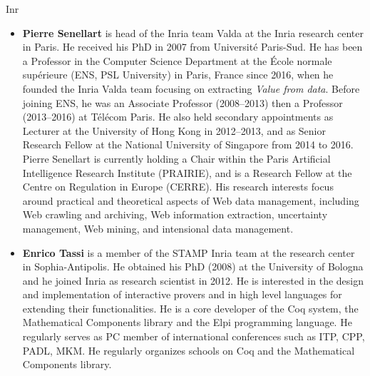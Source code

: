 \begin{sitedescription}{Inr}
\begin{itemize}
\item{\bf Pierre Senellart} is head of the Inria team Valda at the Inria
  research center in Paris. He
  received his PhD in 2007 from Université Paris-Sud. He has been a
    Professor in the Computer Science Department at the École normale
    supérieure (ENS, PSL University) in Paris, France since 2016, when he
    founded the Inria Valda team focusing on extracting \emph{Value from
    data}. Before joining ENS, he was an Associate Professor (2008–2013)
    then a Professor (2013–2016) at Télécom Paris. He also held secondary
    appointments as Lecturer at the University of Hong Kong in 2012–2013,
    and as Senior Research Fellow at the National University of Singapore
    from 2014 to 2016. Pierre Senellart is currently holding a Chair
    within the Paris Artificial Intelligence Research Institute
    (PRAIRIE), and is a Research Fellow at the Centre on Regulation in
    Europe (CERRE).
    His research interests
    focus around practical and theoretical aspects of Web data
    management, including Web crawling and archiving, Web information
    extraction, uncertainty management, Web mining, and intensional data
    management.

\item{\bf Enrico Tassi} is a member of the STAMP Inria team at the research
center in Sophia-Antipolis. He obtained his PhD (2008) at the University of
Bologna and he joined Inria as research scientist in 2012.
He is interested in the design and implementation of interactive
provers and in high level languages for extending their functionalities.
He is a core developer of the Coq system, the Mathematical Components library
and the Elpi programming language. He regularly serves as PC member of
international conferences such as ITP, CPP, PADL, MKM. He regularly organizes
schools on Coq and the Mathematical Components library.



\end{itemize}
\end{sitedescription}
